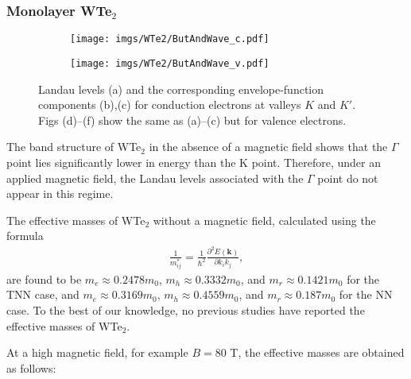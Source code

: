 \documentclass{article}
\begin{document}
\subsubsection*{Monolayer WTe$_{2}$}
\begin{figure}[htb]
	\begin{subfigure}{0.495\textwidth}
		\centering
		\texttt{[image: imgs/WTe2/ButAndWave\_c.pdf]}
	\end{subfigure}
	\begin{subfigure}{0.495\textwidth}
		\centering
		\texttt{[image: imgs/WTe2/ButAndWave\_v.pdf]}
	\end{subfigure}
	\caption{Landau levels (a) and the corresponding envelope-function components (b),(c) for conduction electrons at valleys $K$ and $K'$. Figs (d)–(f) show the same as (a)–(c) but for valence electrons.}
\end{figure}

The band structure of WTe$_{2}$ in the absence of a magnetic field shows that the $\Gamma$ point lies significantly lower in energy than the K point. Therefore, under an applied magnetic field, the Landau levels associated with the $\Gamma$ point do not appear in this regime.

The effective masses of WTe$_{2}$ without a magnetic field, calculated using the formula
\begin{gather}
	\frac{1}{m_{ij}^*} = \frac{1}{\hbar^{2}} \frac{\partial^{2}E(\mathbf{k})}{\partial k_{i} k_{j}},
\end{gather}
are found to be $m_{e} \approx 0.2478 m_{0}$, $m_{h} \approx 0.3332 m_{0}$, and $m_{r} \approx 0.1421 m_{0}$ for the TNN case, and $m_{e} \approx 0.3169 m_{0}$, $m_{h} \approx 0.4559 m_{0}$, and $m_{r} \approx 0.187 m_{0}$ for the NN case. To the best of our knowledge, no previous studies have reported the effective masses of WTe$_{2}$.

At a high magnetic field, for example $B = 80$ T, the effective masses are obtained as follows:
\end{document}
